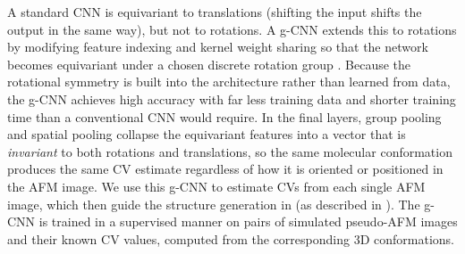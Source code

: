 A standard CNN is equivariant to translations (shifting the input shifts the output in the same way), but not to rotations.
A g-CNN extends this to rotations by modifying feature indexing and kernel weight sharing so that the network becomes equivariant under a chosen discrete rotation group \cite{CohenWelling2016_GCNN, e2cnn}.
Because the rotational symmetry is built into the architecture rather than learned from data, the g-CNN achieves high accuracy with far less training data and shorter training time than a conventional CNN would require.
In the final layers, group pooling and spatial pooling collapse the equivariant features into a vector that is \emph{invariant} to both rotations and translations, so the same molecular conformation produces the same CV estimate regardless of how it is oriented or positioned in the AFM image.
We use this g-CNN to estimate CVs from each single AFM image, which then guide the structure generation in \AFiii (as described in ).
The g-CNN is trained in a supervised manner on pairs of simulated pseudo-AFM images and their known CV values, computed from the corresponding 3D conformations.
